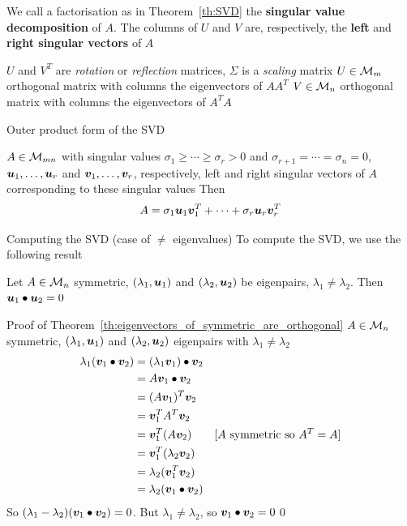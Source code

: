\documentclass[aspectratio=169]{beamer}\usepackage[]{graphicx}\usepackage[]{xcolor}
\begin{document}
\begin{frame}
\begin{definition}
We call a factorisation as in Theorem~\ref{th:SVD} the \textbf{singular value decomposition} of $A$. The columns of $U$ and $V$ are, respectively, the \textbf{left} and \textbf{right singular vectors} of $A$
\end{definition}
\vfill
$U$ and $V^T$ are \emph{rotation} or \emph{reflection} matrices, $\Sigma$ is a \emph{scaling} matrix
\vfill
$U\in\mathcal{M}_m$ orthogonal matrix with columns the eigenvectors of $AA^T$
\vfill
$V\in\mathcal{M}_n$ orthogonal matrix with columns the eigenvectors of $A^TA$
\end{frame}


\begin{frame}{Outer product form of the SVD}
\begin{theorem}\label{th:SVD_outer_product_form}
$A\in\mathcal{M}_{mn}$ with singular values $\sigma_1\geq\cdots\geq\sigma_r>0$ and $\sigma_{r+1}=\cdots=\sigma_n=0$, $\bm{u}_1,\ldots,\bm{u}_r$ and $\bm{v}_1,\ldots,\bm{v}_r$, respectively, left and right singular vectors of $A$ corresponding to these singular values
\vskip0.5cm
Then 
\[
A=\sigma_1\bm{u}_1\bm{v}_1^T+\cdots+\sigma_r\bm{u}_r\bm{v}_r^T
\]
\end{theorem}
\end{frame}


\begin{frame}{Computing the SVD (case of $\neq$ eigenvalues)}
To compute the SVD, we use the following result
\vfill
\begin{theorem}\label{th:eigenvectors_of_symmetric_are_orthogonal}
Let $A\in\mathcal{M}_n$ symmetric, $(\lambda_1,\bm{u}_1)$ and $(\lambda_2,\bm{u}_2)$ be eigenpairs, $\lambda_1\neq\lambda_2$. Then $\bm{u}_1\bullet\bm{u}_2=0$
\end{theorem}
\end{frame}

\begin{frame}{Proof of Theorem~\ref{th:eigenvectors_of_symmetric_are_orthogonal}}
$A\in\mathcal{M}_n$ symmetric, $(\lambda_1,\bm{u}_1)$ and $(\lambda_2,\bm{u}_2)$ eigenpairs with $\lambda_1\neq\lambda_2$
\begin{align*}
\lambda_1(\bm{v}_1\bullet\bm{v}_2) 
&= (\lambda_1\bm{v}_1)\bullet\bm{v}_2 \\
&= A\bm{v}_1\bullet\bm{v}_2 \\
&= (A\bm{v}_1)^T\bm{v}_2 \\
&= \bm{v}_1^TA^T\bm{v}_2 \\
&= \bm{v}_1^T(A\bm{v}_2)  \qquad\textrm{[$A$ symmetric so $A^T=A$]} \\
&= \bm{v}_1^T(\lambda_2\bm{v}_2) \\
&= \lambda_2(\bm{v}_1^T\bm{v}_2) \\
&= \lambda_2(\bm{v}_1\bullet\bm{v}_2)
\end{align*}
\vfill
So $(\lambda_1-\lambda_2)(\bm{v}_1\bullet\bm{v}_2)=0$. But $\lambda_1\neq\lambda_2$, so $\bm{v}_1\bullet\bm{v}_2=0$\hfill\qed
\end{frame}
\end{document}
